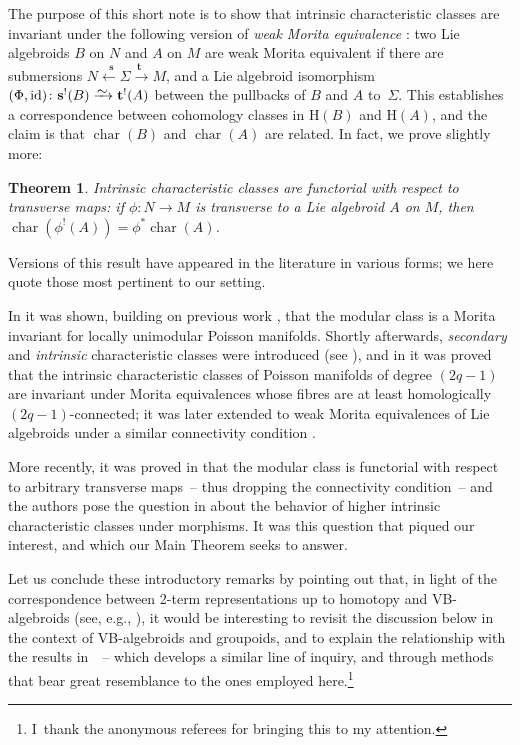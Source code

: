 \documentclass[11pt]{article}
\numberwithin{equation}{section}
\newcommand{\diffto}{\xrightarrow{\raisebox{-0.2 em}[0pt][0pt]{\smash{\ensuremath{\sim}}}}}
\newcommand{\id}{\mathrm{id}}
\newcommand{\8}{\infty}
\newtheorem*{theorem*}{Theorem}
\begin{document}
The purpose of this short note is to show that intrinsic characteristic classes are invariant under the following version of \emph{weak Morita equivalence} \cite[Section~6.2]{Ginz01}: two Lie algebroids $B$ on $N$ and $A$ on $M$ are weak Morita equivalent if there are submersions $N \stackrel{\phantom{1}\mathbf{s}}{\leftarrow} \Sigma \stackrel{\mathbf{t}\phantom{1}}{\to} M$, and a Lie algebroid isomorphism $(\Phi,\id)\colon \mathbf{s}^!(B) \diffto \mathbf{t}^!(A)$ between the pullbacks of $B$ and $A$ to~$\Sigma$. This establishes a correspondence between cohomology classes in $\mathrm{H}(B)$ and $\mathrm{H}(A)$, and the claim is that $\operatorname{char}(B)$ and $\operatorname{char}(A)$ are related. In fact, we prove slightly more:

\begin{theorem*}\label{thm : pullback of char} Intrinsic characteristic classes are functorial with respect to transverse maps: if $\phi\colon N \to M$ is transverse to a Lie algebroid $A$ on $M$, then $\operatorname{char}(\phi^!(A)) = \phi^*\operatorname{char}(A)$.
\end{theorem*}

Versions of this result have appeared in the literature in various forms; we here quote those most pertinent to our setting.

In \cite[Theorem 4.2]{GinzGol} it was shown, building on previous work \cite{GinzLu}, that the modular class is a Morita invariant for locally unimodular Poisson manifolds. Shortly afterwards, \emph{secondary} and \emph{intrinsic} characteristic classes were introduced (see \cite{CrainicNL,Cr_VEst,CrFer_Char,RuiAdv,Kubarski}), and in \cite[Corollary 8]{Cr_VEst} it was proved that the intrinsic characteristic classes of Poisson manifolds of degree $(2q-1)$ are invariant under Morita equivalences whose fibres are at least homologically $(2q-1)$-connected; it was later extended to weak Morita equivalences of Lie algebroids under a similar connectivity condition \cite[Example~6.16]{Ginz01}.

More recently, it was proved in \cite[Theorem~3.10]{YvetteLaurentAlan} that the modular class is functorial with respect to arbitrary transverse maps~-- thus dropping the connectivity condition~-- and the authors pose the question in \cite[(iii), p.~729]{YvetteLaurentAlan} about the behavior of higher intrinsic characteristic classes under morphisms. It was this question that piqued our interest, and which our Main Theorem seeks to answer.

Let us conclude these introductory remarks by pointing out that, in light of the correspondence between 2-term representations up to homotopy and VB-algebroids (see, e.g., \cite{GraciaMehta}), it would be interesting to revisit the discussion below in the context of VB-algebroids and groupoids, and to explain the relationship with the results in~\cite{HoyoOrtiz}~-- which develops a similar line of inquiry, and through methods that bear great resemblance to the ones employed here.\footnote{I~thank the anonymous referees for bringing this to my attention.}
\end{document}
